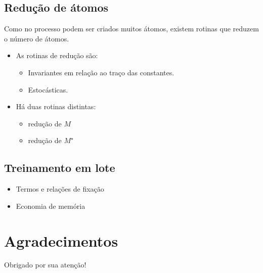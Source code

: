 \documentclass{beamer}
\begin{document}
\subsection{Redução de átomos}
\begin{frame}{\subsecname}
    Como no processo podem ser criados muitos átomos, existem rotinas que reduzem o número de átomos.
    \begin{itemize}
        \item As rotinas de redução são:
        \begin{itemize}
            \item Invariantes em relação ao traço das constantes.
            \item Estocásticas.
        \end{itemize}
        \item Há duas rotinas distintas:
        \begin{itemize}
            \item redução de $M$
            \item redução de $M^\star$
        \end{itemize}
    \end{itemize}
\end{frame}
\subsection{Treinamento em lote}
\begin{frame}{\subsecname}
    \begin{itemize}
        \item Termos e relações de fixação
        \item Economia de memória
    \end{itemize}
\end{frame}
\section*{Agradecimentos}
\begin{frame}{Obrigado por sua atenção!}
    \titlepage
\end{frame}
\end{document}

